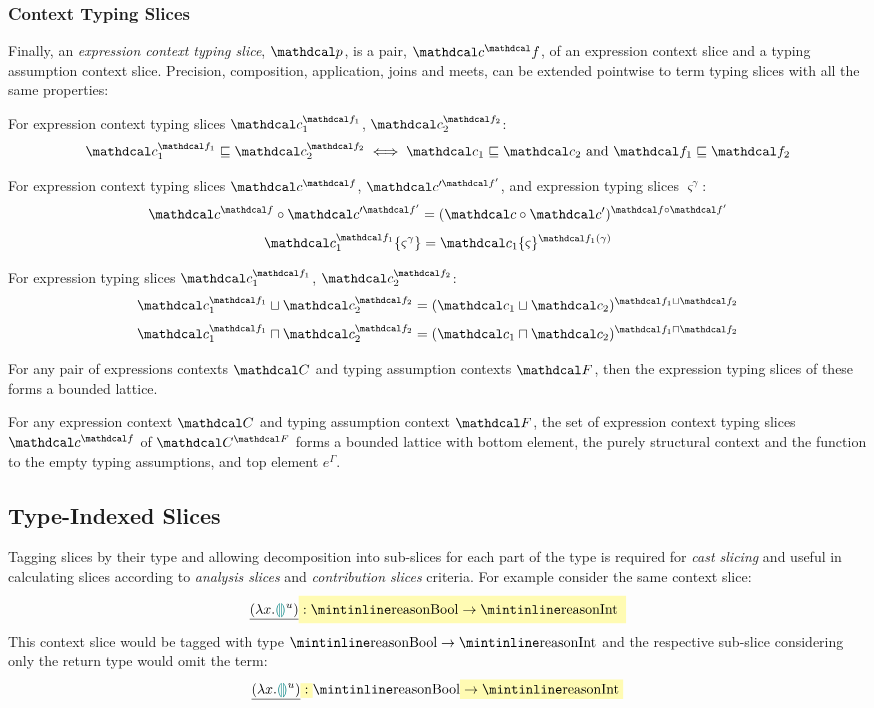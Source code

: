 \subsubsection{Context Typing Slices}
Finally, an \textit{expression context typing slice}, $\p$, is a pair, $\Cs^\f$, of an expression context slice and a typing assumption context slice. Precision, composition, application, joins and meets, can be extended pointwise to term typing slices with all the same properties:
\begin{definition}
For expression context typing slices $\Cs_1^{\f_1}$, $\Cs_2^{\f_2}$:
\[\Cs_1^{\f_1} \sqsubseteq \Cs_2^{\f_2} \iff  \Cs_1 \sqsubseteq \Cs_2 \text{ and } \f_1 \sqsubseteq \f_2\]
\end{definition}
\begin{definition}
For expression context typing slices $\Cs^{\f}$, $\Cs'^{\f'}$, and expression typing slices $\varsigma^{\gamma}$:
\[\Cs^{\f} \circ \Cs'^{\f'} =  (\Cs \circ \Cs')^{\f \circ \f'}\]
\[\Cs_1^{\f_1}\{\varsigma^{\gamma}\} =  \Cs_1\{\varsigma\}^{\f_1(\gamma)}\]
\end{definition}
\begin{definition}
For expression typing slices $\Cs_1^{\f_1}$, $\Cs_2^{\f_2}$:
\[\Cs_1^{\f_1} \sqcup \Cs_2^{\f_2} = (\Cs_1 \sqcup \Cs_2)^{\f_1 \sqcup \f_2}\]
\[\Cs_1^{\f_1} \sqcap \Cs_2^{\f_2} = (\Cs_1 \sqcap \Cs_2)^{\f_1 \sqcap \f_2}\]
\end{definition}

For any pair of expressions contexts $\C$ and typing assumption contexts $\F$, then the expression typing slices of these forms a bounded lattice.

\begin{proposition}
For any expression context $\C$ and typing assumption context $\F$, the set of expression context typing slices $\Cs^{\f}$ of $\C^{\F}$ forms a bounded lattice with bottom element, the purely structural context and the function to the empty typing assumptions, and top element $e^{\Gamma}$.
\end{proposition}

\subsection{Type-Indexed Slices}\label{sec:TypeIndexedSlices}
Tagging slices by their type and allowing decomposition into sub-slices for each part of the type is required for \textit{cast slicing} and useful in calculating slices according to \textit{analysis slices} and \textit{contribution slices} criteria. For example consider the same context slice:
\[\underline{(\lambda x. \hole^u )} \hlcmaths[yellow!30]{:  \code{Bool} \hlcmaths[yellow!30]{\to \code{Int}}}\]
This context slice would be tagged with type $\code{Bool} \to \code{Int}$ and the respective sub-slice considering only the return type would omit the  term:
\[\underline{(\lambda x. \hole^u )} \hlcmaths[yellow!30]{:}  \code{Bool} \hlcmaths[yellow!30]{\to \code{Int}}\]

